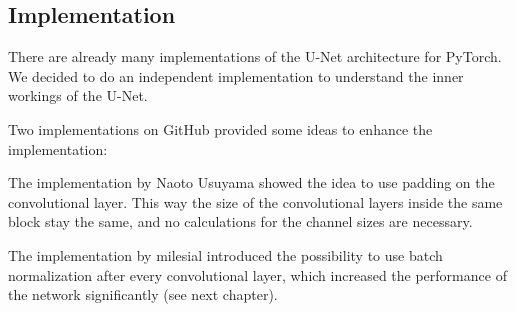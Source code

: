 \subsection{Implementation}
There are already many implementations of the U-Net architecture for PyTorch. We decided to do an independent implementation
to understand the inner workings of the U-Net.

Two implementations on GitHub provided some ideas to enhance the implementation:

The implementation by Naoto Usuyama \cite{unetmilesial} showed the idea to use padding on the convolutional layer. This way
the size of the convolutional layers inside the same block stay the same, and no calculations for the channel sizes are necessary.

The implementation by milesial \cite{unetmilesial} introduced the possibility to use batch normalization after every convolutional layer, which increased the performance
of the network significantly (see next chapter).

